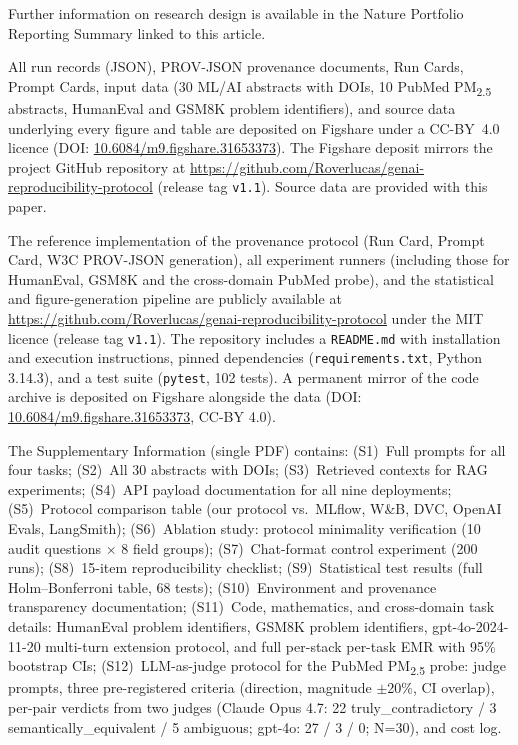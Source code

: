 \documentclass[sn-nature]{sn-jnl}
\begin{document}
Further information on research design is available in the Nature Portfolio Reporting Summary linked to this article.


\backmatter


All run records (JSON), PROV-JSON provenance documents, Run Cards, Prompt Cards, input data (30 ML/AI abstracts with DOIs, 10 PubMed PM\textsubscript{2.5} abstracts, HumanEval and GSM8K problem identifiers), and source data underlying every figure and table are deposited on Figshare under a CC-BY~4.0 licence (DOI: \href{https://doi.org/10.6084/m9.figshare.31653373}{10.6084/m9.figshare.31653373}). The Figshare deposit mirrors the project GitHub repository at \url{https://github.com/Roverlucas/genai-reproducibility-protocol} (release tag \texttt{v1.1}). Source data are provided with this paper.


The reference implementation of the provenance protocol (Run Card, Prompt Card, W3C PROV-JSON generation), all experiment runners (including those for HumanEval, GSM8K and the cross-domain PubMed probe), and the statistical and figure-generation pipeline are publicly available at \url{https://github.com/Roverlucas/genai-reproducibility-protocol} under the MIT licence (release tag \texttt{v1.1}). The repository includes a \texttt{README.md} with installation and execution instructions, pinned dependencies (\texttt{requirements.txt}, Python 3.14.3), and a test suite (\texttt{pytest}, 102 tests). A permanent mirror of the code archive is deposited on Figshare alongside the data (DOI: \href{https://doi.org/10.6084/m9.figshare.31653373}{10.6084/m9.figshare.31653373}, CC-BY 4.0).


The Supplementary Information (single PDF) contains:
(S1)~Full prompts for all four tasks;
(S2)~All 30 abstracts with DOIs;
(S3)~Retrieved contexts for RAG experiments;
(S4)~API payload documentation for all nine deployments;
(S5)~Protocol comparison table (our protocol vs.\ MLflow, W\&B, DVC, OpenAI Evals, LangSmith);
(S6)~Ablation study: protocol minimality verification (10 audit questions $\times$ 8 field groups);
(S7)~Chat-format control experiment (200 runs);
(S8)~15-item reproducibility checklist;
(S9)~Statistical test results (full Holm--Bonferroni table, 68 tests);
(S10)~Environment and provenance transparency documentation;
(S11)~Code, mathematics, and cross-domain task details: HumanEval problem identifiers, GSM8K problem identifiers, gpt-4o-2024-11-20 multi-turn extension protocol, and full per-stack per-task EMR with 95\% bootstrap CIs;
(S12)~LLM-as-judge protocol for the PubMed PM\textsubscript{2.5} probe: judge prompts, three pre-registered criteria (direction, magnitude $\pm$20\%, CI overlap), per-pair verdicts from two judges (Claude Opus 4.7: 22 truly\_contradictory / 3 semantically\_equivalent / 5 ambiguous; gpt-4o: 27 / 3 / 0; N=30), and cost log.
\end{document}
